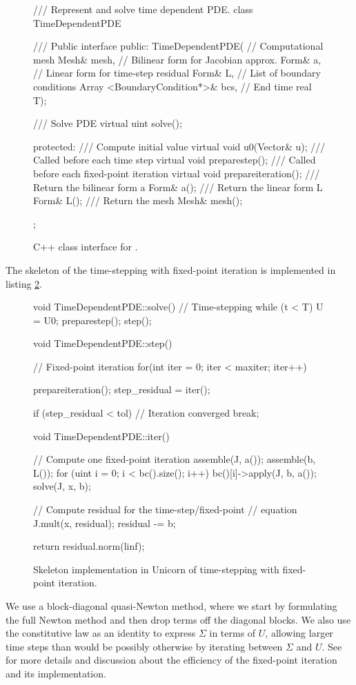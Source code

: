 \begin{figure}
\bwfig
\begin{c++}
/// Represent and solve time dependent PDE.
class TimeDependentPDE
{
  /// Public interface
public:
  TimeDependentPDE(
   // Computational mesh
   Mesh& mesh,
   // Bilinear form for Jacobian approx.
   Form& a,
   // Linear form for time-step residual
   Form& L,
   // List of boundary conditions
   Array <BoundaryCondition*>& bcs,
   // End time
   real T);

  /// Solve PDE
  virtual uint solve();

protected:
  /// Compute initial value
  virtual void u0(Vector& u);
  /// Called before each time step
  virtual void preparestep();
  /// Called before each fixed-point iteration
  virtual void prepareiteration();
  /// Return the bilinear form a
  Form& a();
  /// Return the linear form L
  Form& L();
  /// Return the mesh
  Mesh& mesh();
};
\end{c++}
\caption{C++ class interface for .}
\label{code:TimeDependentPDE}
\end{figure}
The skeleton of the time-stepping with fixed-point iteration is
implemented in listing \ref{code:time-stepping}.

\begin{figure}
\bwfig
\begin{c++}
void TimeDependentPDE::solve()
{
  // Time-stepping
  while (t < T)
  {
    U = U0;
    preparestep();
    step();
  }
}

void TimeDependentPDE::step()
{
  // Fixed-point iteration
  for(int iter = 0; iter < maxiter; iter++)
  {
    prepareiteration();
    step_residual = iter();

    if (step_residual < tol)
    {
      // Iteration converged
      break;
    }
  }
}

void TimeDependentPDE::iter()
{
  // Compute one fixed-point iteration
  assemble(J, a());
  assemble(b, L());
  for (uint i = 0; i < bc().size(); i++)
    bc()[i]->apply(J, b, a());
  solve(J, x, b);

  // Compute residual for the time-step/fixed-point
  // equation
  J.mult(x, residual);
  residual -= b;

  return residual.norm(linf);
}
\end{c++}
\caption{Skeleton implementation in Unicorn of time-stepping with
fixed-point iteration.}
\label{code:time-stepping}
\end{figure}

We use a block-diagonal quasi-Newton method, where we start by
formulating the full Newton method and then drop terms off the
diagonal blocks. We also use the constitutive law as an identity to
express $\Sigma$ in terms of $U$, allowing larger time steps than
would be possibly otherwise by iterating between $\Sigma$ and $U$.
See \citet{Jansson2009,HoffmanJanssonStockli2011} for more details and
discussion about the efficiency of the fixed-point iteration and its
implementation.

